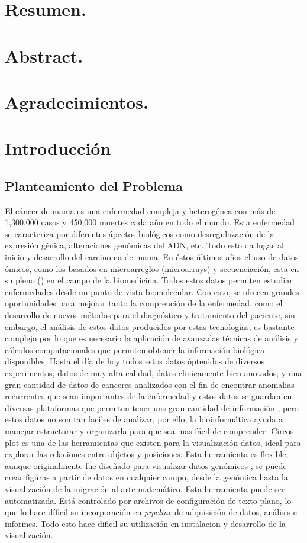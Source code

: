 \documentclass[12pt,letterpaper]{article}
\author{Juan Jose Martinez Ulloa}
\begin{document}

\section*{Resumen.}
\section*{Abstract.}
\section*{Agradecimientos.}
\tableofcontents %
\section{Introducción}
\subsection{Planteamiento del Problema}
El cáncer de mama es una enfermedad compleja y heterogénea con más de 1,300,000 casos y 450,000 muertes cada año en todo el mundo. Esta enfermedad se caracteriza por diferentes ápectos biológicos como desregulazación de la expresión génica, alteraciones genómicas del ADN, etc. Todo esto da lugar al inicio y desarrollo del carcinoma de mama. En éstos últimos años el uso de datos ómicos, como los basados en  microarreglos (microarrays) y secuenciación, esta en su pleno () en el campo de la biomedicina. Todos estos datos permiten estudiar enfermedades desde un punto de vista biomolecular. Con esto, se ofrecen grandes oportunidades para mejorar tanto la comprención de la enfermedad, como el desarrollo de nuevos métodos para el diagnóstico y tratamiento del paciente, sin embargo, el análisis de estos datos producidos por estas tecnologías, es bastante complejo por lo que es necesario la aplicación de avanzadas técnicas de análisis y cálculos computacionales que permiten obtener la información biológica disponibles. Hasta el día de hoy todos estos datos óptenidos de diversos experimentos, datos de muy alta calidad, datos clinicamente bien anotados, y una gran cantidad de datos de canceres analizados con el fin de encontrar anomalias recurrentes que sean importantes de la enfermedad y estos datos se guardan en diversas plataformas que permiten tener uns gran cantidad de información , pero estos datos no son tan faciles de analizar, por ello, la bioinformática ayuda a manejar estructurar y organizarla para que sea mas fácil de comprender. Circos plot es una de las herramientas que existen para la visualización datos, ideal para explorar las relaciones entre objetos y posiciones. Esta herramienta es flexible, aunque originalmente fue diseñado para visualizar datos genómicos , se puede crear figúras a partir de datos en cualquier campo, desde la genómica hasta la visualización de la migración al arte matemático. Esta herramienta puede ser automatizada. Está controlado por archivos de configuración de texto plano, lo que lo hace díficil su incorporación en \textit{pipeline} de adquisición de datos, análisis e informes. Todo esto hace dificil su utilización en instalacion y desarrollo de la visualización. 
\end{document}
